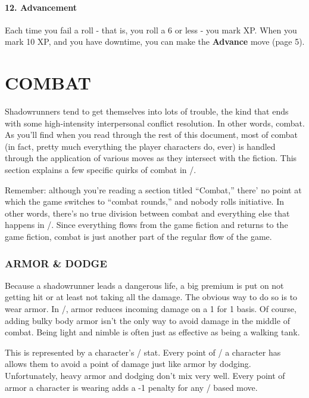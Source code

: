 \documentclass[oneside,10pt]{article}
\begin{document}
\begin{multicols}{2}
\paragraph{12.  Advancement}

Each time you fail a roll - that is, you roll a 6 or less - you mark
XP. When you mark 10 XP, and you have downtime, you can
make the \textbf{Advance} move (page 5).


\end{multicols}

\newpage
\switchToLayoutPageA{}
\section{COMBAT}
\label{combat}
\begin{multicols}{2}

Shadowrunners tend to get themselves into lots of trouble, the kind
that ends with some high-intensity interpersonal conflict
resolution. In other words, combat. As you’ll find when you read
through the rest of this document, most of combat (in fact, pretty
much everything the player characters do, ever) is handled through
the application of various moves as they intersect with the
fiction. This section explains a few specific quirks of combat in
\SW/.

Remember: although you’re reading a section titled ``Combat,'' there’
no point at which the game switches to ``combat rounds,'' and nobody
rolls initiative. In other words, there’s no true division between
combat and everything else that happens in \SW/. Since everything
flows from the game fiction and returns to the game fiction, combat is
just another part of the regular flow of the game.

\subsubsection{ARMOR \& DODGE}
Because a shadowrunner leads a dangerous life, a big premium is put on
not getting hit or at least not taking all the damage. The obvious way
to do so is to wear armor. In \SW/, armor reduces incoming damage on a
1 for 1 basis.  Of course, adding bulky body armor isn't the only way
to avoid damage in the middle of combat. Being light and nimble is
often just as effective as being a walking tank.

This is represented by a character's \twitch/ stat. Every point of
\twitch/ a character has allows them to avoid a point of damage just
like armor by dodging. Unfortunately, heavy armor and dodging don't
mix very well. Every point of armor a character is wearing adds a -1
penalty for any \twitch/ based move.


\end{multicols}
\end{document}
